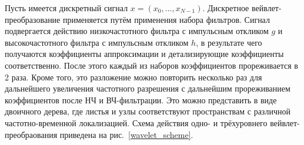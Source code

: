 \documentclass[12pt,fleqn]{article}
\begin{document}
\begin{itemize}
	\par Пусть имеется дискретный сигнал $x = (x_0, \dots, x_{N-1})$. Дискретное вейвлет-преобразование применяется путём применения набора фильтров. Сигнал подвергается действию низкочастотного фильтра с импульсным откликом $g$ и высокочастотного фильтра с импульсным откликом $h$, в результате чего получаются коэффициенты аппроксимации и детализирующие коэффициенты соответственно. После этого каждый из наборов коэффициентов прореживается в 2 раза. Кроме того, это разложение можно повторить несколько раз для дальнейшего увеличения частотного разрешения с дальнейшим прореживанием коэффициентов после НЧ и ВЧ-фильтрации. Это можно представить в виде двоичного дерева, где листья и узлы соответствуют пространствам с различной частотно-временной локализацией. Схема действия одно- и трёхуровнего вейвлет-преобраования приведена на рис.~\ref{wavelet_scheme}.


\end{itemize}
\end{document}
